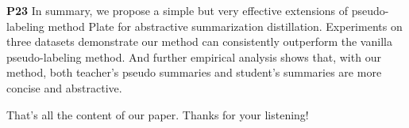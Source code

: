 \documentclass[a4paper, 12pt]{article}
\begin{document}
\textbf{P23}
In summary, we propose a simple but very effective extensions of pseudo-labeling method {\sc Plate} for abstractive summarization distillation. Experiments on three datasets demonstrate our method can consistently outperform the vanilla pseudo-labeling method. And further empirical analysis shows that, with our method, both teacher's pseudo summaries and student's summaries are more concise and abstractive.

That's all the content of our paper. Thanks for your listening!
\end{document}
